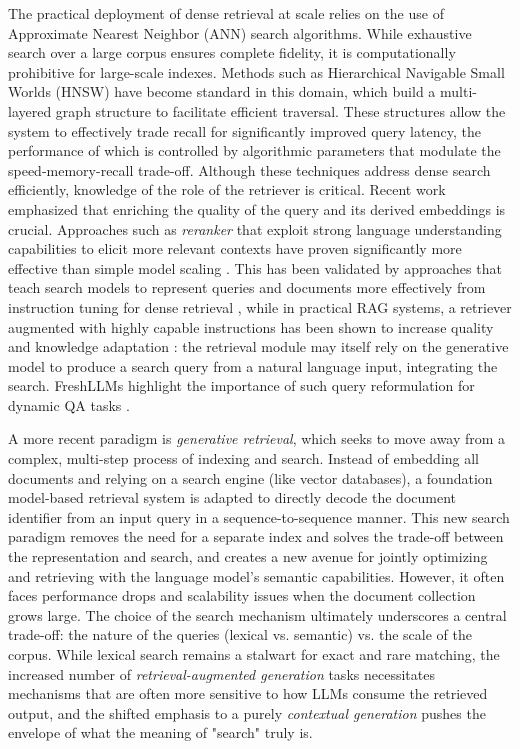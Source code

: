 \documentclass[11pt,a4paper]{article}
\begin{document}
The practical deployment of dense retrieval at scale relies on the use of Approximate Nearest Neighbor (ANN) search algorithms. While exhaustive search over a large corpus ensures complete fidelity, it is computationally prohibitive for large-scale indexes. Methods such as Hierarchical Navigable Small Worlds (HNSW) have become standard in this domain, which build a multi-layered graph structure to facilitate efficient traversal. These structures allow the system to effectively trade recall for significantly improved query latency, the performance of which is controlled by algorithmic parameters that modulate the speed-memory-recall trade-off. Although these techniques address dense search efficiently, knowledge of the role of the retriever is critical. Recent work emphasized that enriching the quality of the query and its derived embeddings is crucial. Approaches such as \emph{reranker} that exploit strong language understanding capabilities to elicit more relevant contexts have proven significantly more effective than simple model scaling \cite{arxiv:2407.02485v1}. This has been validated by approaches that teach search models to represent queries and documents more effectively from instruction tuning for dense retrieval \cite{arxiv:2401.06532v2}, while in practical RAG systems, a retriever augmented with highly capable instructions has been shown to increase quality and knowledge adaptation \cite{arxiv:2312.05934v3}: the retrieval module may itself rely on the generative model to produce a search query from a natural language input, integrating the search. FreshLLMs highlight the importance of such query reformulation for dynamic QA tasks \cite{arxiv:2310.03214v2}.

A more recent paradigm is \emph{generative retrieval}, which seeks to move away from a complex, multi-step process of indexing and search. Instead of embedding all documents and relying on a search engine (like vector databases), a foundation model-based retrieval system is adapted to directly decode the document identifier from an input query in a sequence-to-sequence manner. This new search paradigm removes the need for a separate index and solves the trade-off between the representation and search, and creates a new avenue for jointly optimizing and retrieving with the language model's semantic capabilities. However, it often faces performance drops and scalability issues when the document collection grows large. The choice of the search mechanism ultimately underscores a central trade-off: the nature of the queries (lexical vs. semantic) vs. the scale of the corpus. While lexical search remains a stalwart for exact and rare matching, the increased number of \emph{retrieval-augmented generation} tasks necessitates mechanisms that are often more sensitive to how LLMs consume the retrieved output, and the shifted emphasis to a purely \emph{contextual generation} pushes the envelope of what the meaning of "search" truly is.
\end{document}
